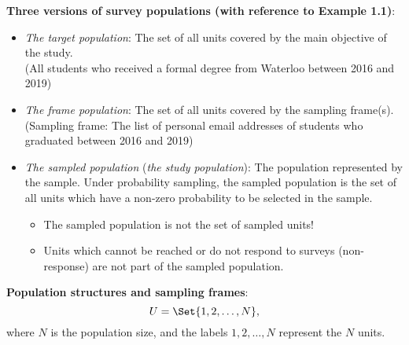 \documentclass[oneside]{book}\usepackage[]{graphicx}\usepackage[svgnames]{xcolor}
\begin{document}
\textbf{Three versions of survey populations (with reference to Example 1.1)}:
\begin{itemize}
      \item \emph{The target population}: The set of all units covered by the main
            objective of the study.\\
            (All students who received a formal degree from Waterloo
            between 2016 and 2019)
      \item \emph{The frame population}: The set of all units covered by the
            sampling frame(s).\\
            (Sampling frame: The list of personal email addresses of
            students who graduated between 2016 and 2019)
      \item \emph{The sampled population} (\emph{the study population}):
            The population represented by the sample. Under probability sampling, the
            sampled population is the set of all units which have a non-zero
            probability to be selected in the sample.
            \begin{itemize}
                  \item The sampled population is not the set of sampled units!
                  \item Units which cannot be reached or do not respond to surveys
                        (non-response) are not part of the sampled population.
            \end{itemize}
\end{itemize}
\textbf{Population structures and sampling frames}:
\[ U=\Set{1,2,\ldots,N}, \]
where $ N $ is the population size, and the labels $ 1,2,\ldots,N $ represent
the $ N $ units.
\end{document}
